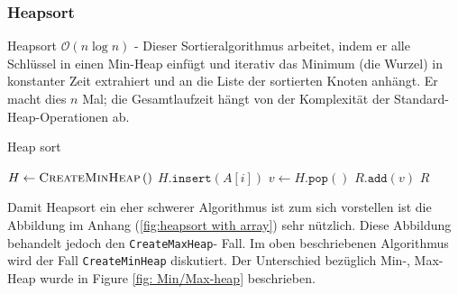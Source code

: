\documentclass[a4paper]{article}
\begin{document}
\newpage
    \subsubsection{Heapsort}\label{Heapsort}
        Heapsort $\mathcal{O}(n \log n)$ - Dieser Sortieralgorithmus arbeitet, indem er alle Schlüssel in einen Min-Heap einfügt und iterativ das Minimum (die Wurzel) in konstanter Zeit extrahiert und an die Liste der sortierten Knoten anhängt. Er macht dies $n$ Mal; die Gesamtlaufzeit hängt von der Komplexität der Standard-Heap-Operationen ab.
        
        \begin{algorithm}[h]
            \caption{Heap sort}
            \label{alg:HeapSort}
            \begin{algorithmic} 
            \State $H \gets \textsc{CreateMinHeap}\left(\right)$
            \State $H\texttt{.insert}\left(A\left[i\right]\right)$
            \EndFor
            \State $v \gets H\texttt{.pop}\left(\right)$
            \State $R\texttt{.add}\left(v\right)$
            \EndFor
            \State \Return $R$
            \end{algorithmic}
        \end{algorithm}
        
    Damit Heapsort ein eher schwerer Algorithmus ist zum sich vorstellen ist die Abbildung im Anhang (\ref{fig:heapsort with array}) sehr nützlich. Diese Abbildung behandelt jedoch den \texttt{CreateMaxHeap}- Fall. Im oben beschriebenen Algorithmus wird der Fall \texttt{CreateMinHeap}  diskutiert. Der Unterschied bezüglich Min-, Max-Heap wurde in Figure \ref{fig: Min/Max-heap} beschrieben.\label{VerlinkzuHeapSortText}


    
\end{document}
